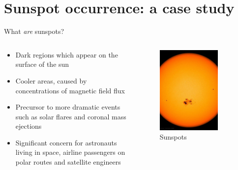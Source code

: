 \documentclass[aspectratio=169]{beamer}
\begin{document}
\section{Sunspot occurrence: a case study}

\begin{frame}{What \emph{are} sunspots?}
  \begin{columns}
    \begin{column}{0.6\textwidth}
      \begin{itemize}
        \item Dark regions which appear on the surface of the sun
        \item Cooler areas, caused by concentrations of magnetic field flux
        \item Precursor to more dramatic events such as solar flares and
              coronal mass ejections
        \item Significant concern for astronauts living in space, airline
              passengers on polar routes and satellite engineers
      \end{itemize}
    \end{column}%
    \begin{column}{0.4\textwidth}
      \begin{figure}
        \includegraphics[width=0.8\textwidth]{sun.jpg}
        \caption{Sunspots}
      \end{figure}
    \end{column}
  \end{columns}
\end{frame}
\end{document}
